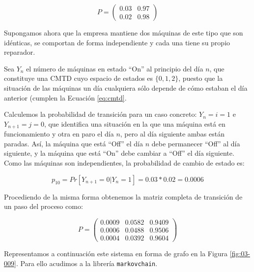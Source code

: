 \documentclass[
]{book}
\theoremstyle{definition}
\theoremstyle{definition}
\theoremstyle{definition}
\theoremstyle{definition}
\theoremstyle{remark}
\begin{document}
\[P = 
\begin{pmatrix}
0.03 & 0.97\\
0.02 & 0.98
\end{pmatrix}\]

Supongamos ahora que la empresa mantiene dos máquinas de este tipo que son idénticas, se comportan de forma independiente y cada una tiene su propio reparador.

Sea \(Y_n\) el número de máquinas en estado ``On'' al principio del día \(n\), que constituye una CMTD cuyo espacio de estados es \(\{0, 1, 2\}\), puesto que la situación de las máquinas un día cualquiera sólo depende de cómo estaban el día anterior (cumplen la Ecuación \eqref{eq:cmtd}.

Calculemos la probabilidad de transición para un caso concreto: \(Y_n = i = 1\) e \(Y_{n+1} = j = 0\), que identifica una situación en la que una máquina está en funcionamiento y otra en paro el día \(n\), pero al día siguiente ambas están paradas. Así, la máquina que está ``Off'' el día \(n\) debe permanecer ``Off'' al día siguiente, y la máquina que está ``On'' debe cambiar a ``Off'' el día siguiente. Como las máquinas son independientes, la probabilidad de cambio de estado es:

\[p_{10}=Pr[Y_{n+1} = 0 | Y_n = 1] = 0.03 * 0.02 = 0.0006\]

Procediendo de la misma forma obtenemos la matriz completa de transición de un paso del proceso como:

\[P = 
\begin{pmatrix}
0.0009 & 0.0582 & 0.9409\\
0.0006 & 0.0488 & 0.9506\\
0.0004 & 0.0392 & 0.9604
\end{pmatrix}\]

Representamos a continuación este sistema en forma de grafo en la Figura \ref{fig:03-009}. Para ello acudimos a la librería \texttt{markovchain}.
\end{document}

